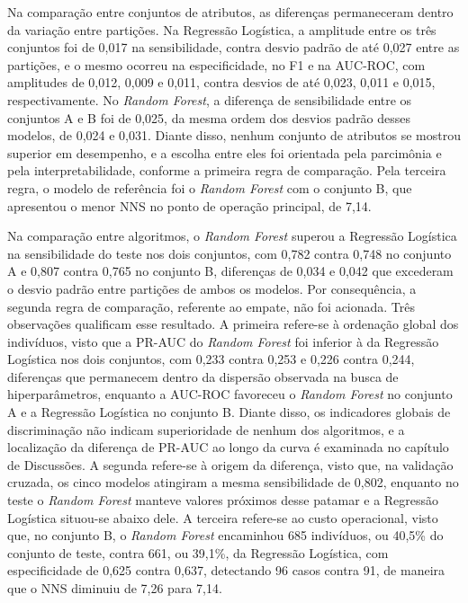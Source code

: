 Na comparação entre conjuntos de atributos, as diferenças permaneceram dentro da variação entre partições. Na Regressão Logística, a amplitude entre os três conjuntos foi de 0,017 na sensibilidade, contra desvio padrão de até 0,027 entre as partições, e o mesmo ocorreu na especificidade, no F1 e na AUC-ROC, com amplitudes de 0,012, 0,009 e 0,011, contra desvios de até 0,023, 0,011 e 0,015, respectivamente. No \textit{Random Forest}, a diferença de sensibilidade entre os conjuntos A e B foi de 0,025, da mesma ordem dos desvios padrão desses modelos, de 0,024 e 0,031. Diante disso, nenhum conjunto de atributos se mostrou superior em desempenho, e a escolha entre eles foi orientada pela parcimônia e pela interpretabilidade, conforme a primeira regra de comparação. Pela terceira regra, o modelo de referência foi o \textit{Random Forest} com o conjunto B, que apresentou o menor NNS no ponto de operação principal, de 7,14.

Na comparação entre algoritmos, o \textit{Random Forest} superou a Regressão Logística na sensibilidade do teste nos dois conjuntos, com 0,782 contra 0,748 no conjunto A e 0,807 contra 0,765 no conjunto B, diferenças de 0,034 e 0,042 que excederam o desvio padrão entre partições de ambos os modelos. Por consequência, a segunda regra de comparação, referente ao empate, não foi acionada. Três observações qualificam esse resultado. A primeira refere-se à ordenação global dos indivíduos, visto que a PR-AUC do \textit{Random Forest} foi inferior à da Regressão Logística nos dois conjuntos, com 0,233 contra 0,253 e 0,226 contra 0,244, diferenças que permanecem dentro da dispersão observada na busca de hiperparâmetros, enquanto a AUC-ROC favoreceu o \textit{Random Forest} no conjunto A e a Regressão Logística no conjunto B. Diante disso, os indicadores globais de discriminação não indicam superioridade de nenhum dos algoritmos, e a localização da diferença de PR-AUC ao longo da curva é examinada no capítulo de Discussões. A segunda refere-se à origem da diferença, visto que, na validação cruzada, os cinco modelos atingiram a mesma sensibilidade de 0,802, enquanto no teste o \textit{Random Forest} manteve valores próximos desse patamar e a Regressão Logística situou-se abaixo dele. A terceira refere-se ao custo operacional, visto que, no conjunto B, o \textit{Random Forest} encaminhou 685 indivíduos, ou 40,5\% do conjunto de teste, contra 661, ou 39,1\%, da Regressão Logística, com especificidade de 0,625 contra 0,637, detectando 96 casos contra 91, de maneira que o NNS diminuiu de 7,26 para 7,14.

